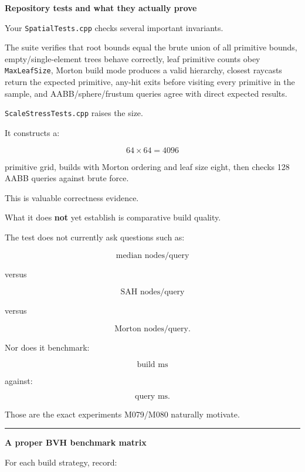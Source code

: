 \textbf{Repository tests and what they actually prove}

Your \texttt{SpatialTests.cpp} checks several important invariants.

The suite verifies that root bounds equal the brute union of all primitive bounds, empty/single-element trees behave correctly, leaf primitive counts obey \texttt{MaxLeafSize}, Morton build mode produces a valid hierarchy, closest raycasts return the expected primitive, any-hit exits before visiting every primitive in the sample, and AABB/sphere/frustum queries agree with direct expected results.

\texttt{ScaleStressTests.cpp} raises the size.

It constructs a:

\[
64\times64=4096
\]

primitive grid, builds with Morton ordering and leaf size eight, then checks 128 AABB queries against brute force.

This is valuable correctness evidence.

What it does \textbf{not} yet establish is comparative build quality.

The test does not currently ask questions such as:

\[
\text{median nodes/query}
\]

versus

\[
\text{SAH nodes/query}
\]

versus

\[
\text{Morton nodes/query}.
\]

Nor does it benchmark:

\[
\text{build ms}
\]

against:

\[
\text{query ms}.
\]

Those are the exact experiments M079/M080 naturally motivate.

\begin{center}\rule{0.5\linewidth}{0.5pt}\end{center}

\textbf{A proper BVH benchmark matrix}

For each build strategy, record:

